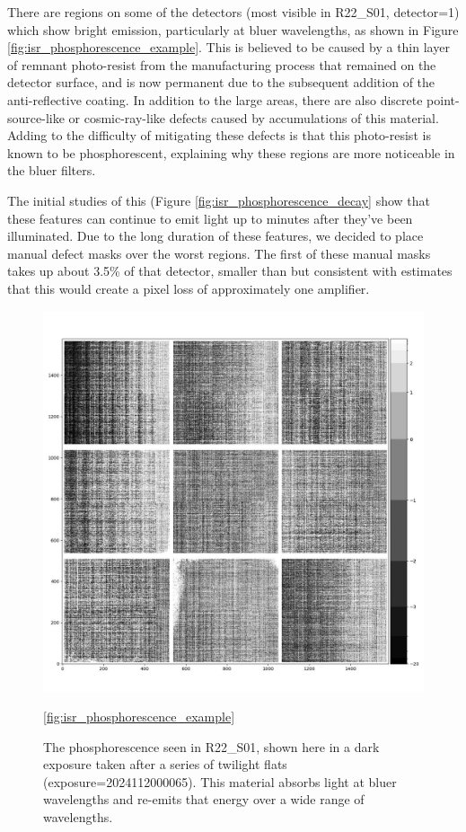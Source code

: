 There are regions on some of the detectors (most visible in R22\_S01, detector=1) which show bright emission, particularly at bluer wavelengths, as shown in Figure \ref{fig:isr_phosphorescence_example}.
This is believed to be caused by a thin layer of remnant photo-resist from the manufacturing process that remained on the detector surface, and is now permanent due to the subsequent addition of the anti-reflective coating.
In addition to the large areas, there are also discrete point-source-like or cosmic-ray-like defects caused by accumulations of this material.
Adding to the difficulty of mitigating these defects is that this photo-resist is known to be phosphorescent, explaining why these regions are more noticeable in the bluer filters.

The initial studies of this (Figure \ref{fig:isr_phosphorescence_decay} show that these features can continue to emit light up to minutes after they've been illuminated.
Due to the long duration of these features, we decided to place manual defect masks over the worst regions.
The first of these manual masks takes up about 3.5\% of that detector, smaller than but consistent with estimates that this would create a pixel loss of approximately one amplifier.

\begin{figure}
  \includegraphics{figures/isr-f01-phosphor_dark_exposure.jpg}
  \caption{The phosphorescence seen in R22\_S01, shown here in a dark exposure taken after a series of twilight flats (exposure=2024112000065).  This material absorbs light at bluer wavelengths and re-emits that energy over a wide range of wavelengths.}
  \ref{fig:isr_phosphorescence_example}
\end{figure}

